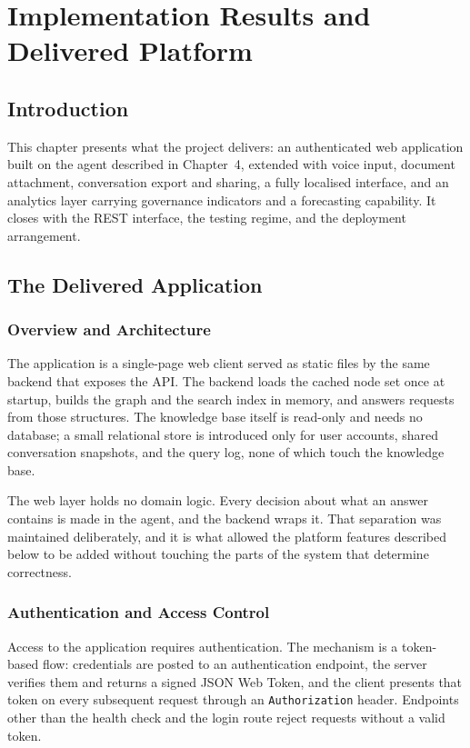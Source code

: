 \chapter{Implementation Results and Delivered Platform}
\minitoc

\section*{Introduction}

This chapter presents what the project delivers: an authenticated web application built on the agent described in Chapter~4, extended with voice input, document attachment, conversation export and sharing, a fully localised interface, and an analytics layer carrying governance indicators and a forecasting capability. It closes with the REST interface, the testing regime, and the deployment arrangement.

\section{The Delivered Application}

\subsection{Overview and Architecture}

The application is a single-page web client served as static files by the same backend that exposes the API. The backend loads the cached node set once at startup, builds the graph and the search index in memory, and answers requests from those structures. The knowledge base itself is read-only and needs no database; a small relational store is introduced only for user accounts, shared conversation snapshots, and the query log, none of which touch the knowledge base.

The web layer holds no domain logic. Every decision about what an answer contains is made in the agent, and the backend wraps it. That separation was maintained deliberately, and it is what allowed the platform features described below to be added without touching the parts of the system that determine correctness.

\subsection{Authentication and Access Control}

Access to the application requires authentication. The mechanism is a token-based flow: credentials are posted to an authentication endpoint, the server verifies them and returns a signed JSON Web Token, and the client presents that token on every subsequent request through an \texttt{Authorization} header. Endpoints other than the health check and the login route reject requests without a valid token.

